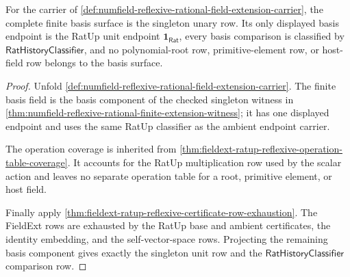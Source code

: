 \begin{theorem}
\label{thm:numfield-reflexive-degree-one-basis-exhaustion}
For the carrier of
\autoref{def:numfield-reflexive-rational-field-extension-carrier}, the complete
finite basis surface is the singleton unary row. Its only displayed basis
endpoint is the RatUp unit endpoint $\mathbf{1}_{\mathsf{Rat}}$, every basis
comparison is classified by $\mathsf{RatHistoryClassifier}$, and no
polynomial-root row, primitive-element row, or host-field row belongs to the
basis surface.
\end{theorem}
\begin{proof}
Unfold
\autoref{def:numfield-reflexive-rational-field-extension-carrier}. The finite
basis field is the basis component of the checked singleton witness in
\autoref{thm:numfield-reflexive-rational-finite-extension-witness}; it has one
displayed endpoint and uses the same RatUp classifier as the ambient endpoint
carrier.

The operation coverage is inherited from
\autoref{thm:fieldext-ratup-reflexive-operation-table-coverage}. It accounts
for the RatUp multiplication row used by the scalar action and leaves no
separate operation table for a root, primitive element, or host field.

Finally apply
\autoref{thm:fieldext-ratup-reflexive-certificate-row-exhaustion}. The
FieldExt rows are exhausted by the RatUp base and ambient certificates, the
identity embedding, and the self-vector-space rows. Projecting the remaining
basis component gives exactly the singleton unit row and the
$\mathsf{RatHistoryClassifier}$ comparison row.
\end{proof}


